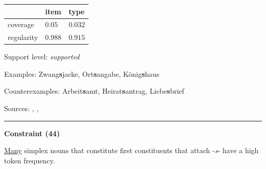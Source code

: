\vspace{-0.35em}

\begin{table}[!ht]
\begin{center}

\begin{tabularx}{\columnwidth}{|X|X|X|}
\hline
 & item & type \\
\hline
 coverage & $0.05$ & $0.032$ \\
\hline
 regularity & $0.988$ & $0.915$ \\
\hline
\end{tabularx}
\end{center}
\end{table}

\vspace{-1.35em}

\noindent
Support level: \textit{supported}

\vspace{0.3em}

\noindent
Examples: Zwang\textbf{s}jacke, Ort\textbf{s}angabe, König\textbf{s}haus

\noindent
Counterexamples: Arbeit\textbf{s}amt, Heirat\textbf{s}antrag, Liebe\textbf{s}brief

\vspace{0.3em}

\noindent
Sources: \citet[23]{kuerschner_2010}, \citet[79]{nuebling_szczepaniak_2013}, \citet[8]{schaefer_pankratz_2018}


\hrule




\newpage

\vspace{0.4em}

\begin{center}
\textbf{Constraint (44)}
\end{center}

\noindent
\underline{Many} simplex nouns that constitute first constituents that attach -\textit{s}- have a high token frequency.
\vspace{0.35em}



